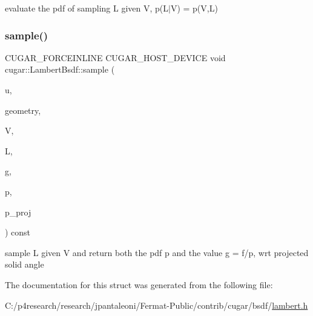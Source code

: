 evaluate the pdf of sampling L given V, p(L$\vert$V) = p(\+V,\+L) \mbox{\label{structcugar_1_1_lambert_bsdf_a6378aa0c0f3667144affa8b5ee1308aa}} 
\subsubsection{\texorpdfstring{sample()}{sample()}}
{\footnotesize\ttfamily C\+U\+G\+A\+R\+\_\+\+F\+O\+R\+C\+E\+I\+N\+L\+I\+NE C\+U\+G\+A\+R\+\_\+\+H\+O\+S\+T\+\_\+\+D\+E\+V\+I\+CE void cugar\+::\+Lambert\+Bsdf\+::sample (\begin{DoxyParamCaption}\item[{const \hyperlink{structcugar_1_1_vector}{Vector3f}}]{u,  }\item[{const \hyperlink{structcugar_1_1_differential_geometry}{Differential\+Geometry} \&}]{geometry,  }\item[{const \hyperlink{structcugar_1_1_vector}{Vector3f}}]{V,  }\item[{\hyperlink{structcugar_1_1_vector}{Vector3f} \&}]{L,  }\item[{\hyperlink{structcugar_1_1_vector}{Vector3f} \&}]{g,  }\item[{float \&}]{p,  }\item[{float \&}]{p\+\_\+proj }\end{DoxyParamCaption}) const\hspace{0.3cm}{\ttfamily [inline]}}

sample L given V and return both the pdf p and the value g = f/p, wrt projected solid angle 

The documentation for this struct was generated from the following file\+:\begin{DoxyCompactItemize}
\item 
C\+:/p4research/research/jpantaleoni/\+Fermat-\/\+Public/contrib/cugar/bsdf/\hyperlink{lambert_8h}{lambert.\+h}\end{DoxyCompactItemize}
